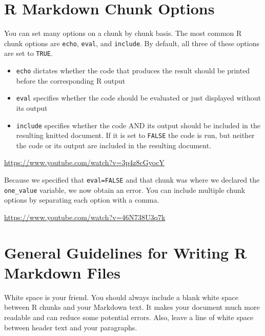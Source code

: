 \documentclass[]{tufte-book}
\begin{document}
\section{R Markdown Chunk Options}\label{r-markdown-chunk-options}

You can set many options on a chunk by chunk basis. The most common R chunk options are \texttt{echo}, \texttt{eval}, and \texttt{include}. By default, all three of these options are set to \texttt{TRUE}.

\begin{itemize}
\item
  \texttt{echo} dictates whether the code that produces the result should be printed before the corresponding R output
\item
  \texttt{eval} specifies whether the code should be evaluated or just displayed without its output
\item
  \texttt{include} specifies whether the code AND its output should be included in the resulting knitted document. If it is set to \texttt{FALSE} the code is run, but neither the code or its output are included in the resulting document.
\end{itemize}

\vspace{0.1in}\begin{center}\footnotesize{\url{https://www.youtube.com/watch?v=3p4z8cGyocY}}\end{center}\vspace{0.1in}

Because we specified that \texttt{eval=FALSE} and that chunk was where we declared the \texttt{one\_value} variable, we now obtain an error. You can include multiple chunk options by separating each option with a comma.

\vspace{0.1in}\begin{center}\footnotesize{\url{https://www.youtube.com/watch?v=46N738U3q7k}}\end{center}\vspace{0.1in}

\section{General Guidelines for Writing R Markdown Files}\label{general-guidelines-for-writing-r-markdown-files}

White space is your friend. You should always include a blank white space between R chunks and your Markdown text. It makes your document much more readable and can reduce some potential errors. Also, leave a line of white space between header text and your paragraphs.
\end{document}
